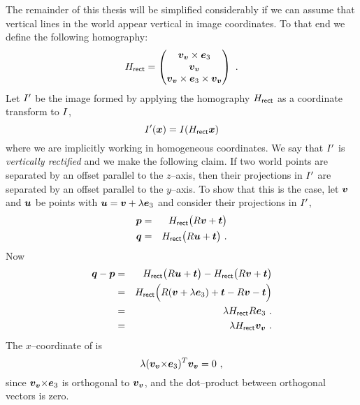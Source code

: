 The remainder of this thesis will be simplified considerably if we can
assume that vertical lines in the world appear vertical in image
coordinates. To that end we define the following homography:
\begin{equation}
  \label{eq:rectifier}
  \Rectifier =
  \begin{pmatrix}
    \vvpt \times \ez \\
    \vvpt \\
    \vvpt \times \ez \times \vvpt
  \end{pmatrix} ~.
\end{equation}
Let $\Image'$ be the image formed by applying the homography $\Rectifier$ as a
coordinate transform to $\Image$,
\begin{equation}
  \label{eq:rectification}
  \Image'(\vect{x}) = \Image(\Rectifier \vect{x})
\end{equation}
where we are implicitly working in homogeneous coordinates. We say
that $\Image'$ is \textit{vertically rectified} and we make the
following claim. If two world points are separated by an offset
parallel to the $z$--axis, then their projections in $\Image'$ are
separated by an offset parallel to the $y$--axis. To show that this is
the case, let $\worldpt$ and $\otherworldpt$ be points with
$\otherworldpt = \worldpt + \lambda \ez$ and consider their
projections in $\Image'$,
\begin{eqnarray}
  \imagept &=& \Rectifier
    \bigl( \CamR \worldpt + \CamTr \bigr)\\
  \otherimagept &=& \Rectifier
    \bigl( \CamR \otherworldpt + \CamTr \bigr)~.
\end{eqnarray}
Now
\begin{eqnarray}
  \otherimagept - \imagept &=&
  \Rectifier
    \bigl( \CamR \otherworldpt + \CamTr \bigr) -
  \Rectifier
    \bigl( \CamR \worldpt + \CamTr \bigr)\\
  &=&
    \Rectifier \Bigl(
      \CamR (\worldpt+\lambda\ez) + \CamTr - \CamR\worldpt - \CamTr
    \Bigr)\\
  &=&
    \lambda \Rectifier \CamR \ez ~.\\
  &=&
    \label{eq:rectified-disp}
    \lambda \Rectifier \vvpt ~.
\end{eqnarray}
The $x$--coordinate of  is
\begin{equation}
  \lambda (\vvpt \cross \ez)^T \vvpt = 0 ~,
\end{equation}
since $\vvpt\cross\ez$ is orthogonal to $\vvpt$, and the
dot--product between orthogonal vectors is zero.

